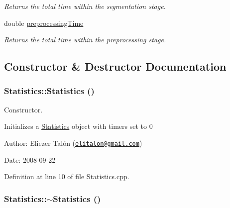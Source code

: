 \begin{CompactItemize}
\begin{CompactList}\small\item\em Returns the total time within the segmentation stage. \item\end{CompactList}\item 
\hypertarget{struct_statistics_57aa8970c666c415db6dcdd0cc3920f6}{
double \hyperlink{struct_statistics_57aa8970c666c415db6dcdd0cc3920f6}{preprocessingTime}}
\label{struct_statistics_57aa8970c666c415db6dcdd0cc3920f6}

\begin{CompactList}\small\item\em Returns the total time within the preprocessing stage. \item\end{CompactList}\end{CompactItemize}


\subsection{Constructor \& Destructor Documentation}
\hypertarget{struct_statistics_60ddd90a571ed4c3ce8c0f6317a36d63}{
\subsubsection[Statistics]{\setlength{\rightskip}{0pt plus 5cm}Statistics::Statistics ()}}
\label{struct_statistics_60ddd90a571ed4c3ce8c0f6317a36d63}


Constructor. 

Initializes a \hyperlink{struct_statistics}{Statistics} object with timers set to 0

\begin{Desc}
\item[Author:]Eliezer Talón (\href{mailto:elitalon@gmail.com}{\tt elitalon@gmail.com}) \end{Desc}
\begin{Desc}
\item[Date:]2008-09-22 \end{Desc}


Definition at line 10 of file Statistics.cpp.\hypertarget{struct_statistics_b68ede75479e44d5c35b78ec1284065b}{
\subsubsection[$\sim$Statistics]{\setlength{\rightskip}{0pt plus 5cm}Statistics::$\sim$Statistics ()}}
\label{struct_statistics_b68ede75479e44d5c35b78ec1284065b}


